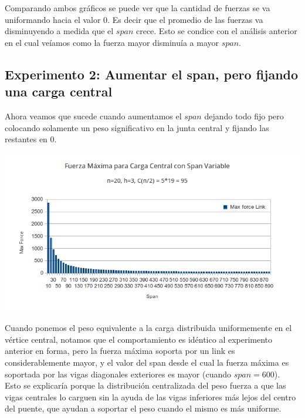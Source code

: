Comparando ambos gráficos se puede ver que la cantidad de fuerzas se va uniformando hacia el valor $0$. Es decir que el promedio de las fuerzas va disminuyendo a medida que el $span$ crece. Esto se condice con el análisis anterior en el cual veíamos como la fuerza mayor disminuía a mayor $span$.

\subsection{Experimento 2: Aumentar el span, pero fijando una carga central}

Ahora veamos que sucede cuando aumentamos el $span$ dejando todo fijo pero colocando solamente un peso significativo en la junta central y fijando las restantes en $0$.

\begin{center}
\includegraphics[scale=0.8]{archivos/graficos/Fuerza-x-span-peso-central.png}\\
\end{center}

Cuando ponemos el peso equivalente a la carga distribuida uniformemente en el vértice central, notamos que el comportamiento es idéntico al experimento anterior en forma, pero la fuerza máxima soporta por un link es considerablemente mayor, y el valor del span desde el cual la fuerza máxima es soportada por las vigas diagonales exteriores es mayor (cuando $span = 600$).\\

Esto se explicaría porque la distribución centralizada del peso fuerza a que las vigas centrales lo carguen sin la ayuda de las vigas inferiores más lejos del centro del puente, que ayudan a soportar el peso cuando el mismo es más uniforme.
